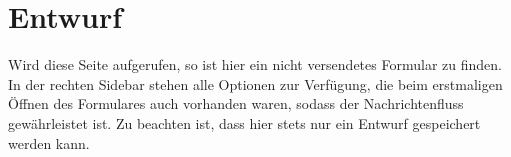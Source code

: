 \documentclass[a4paper,11pt,oneside, titlepage]{article}
\begin{document}
	
	\section{Entwurf}
	Wird diese Seite aufgerufen, so ist hier ein nicht versendetes Formular zu finden. In der rechten Sidebar stehen alle Optionen zur Verfügung, die beim erstmaligen Öffnen des Formulares auch vorhanden waren, sodass der Nachrichtenfluss gewährleistet ist.
	\newline
	Zu beachten ist, dass hier stets nur ein Entwurf gespeichert werden kann. 
	
\end{document}

